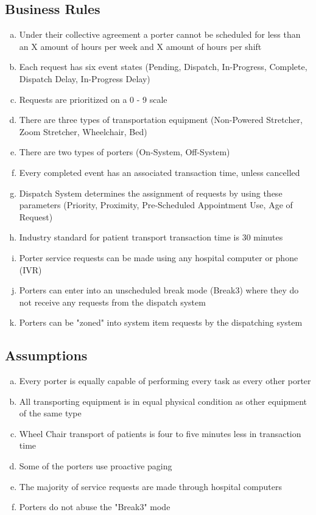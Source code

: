 \documentclass[paper=letter, fontsize=10pt]{scrartcl}
\numberwithin{equation}{section}		%
\numberwithin{figure}{section}			%
\numberwithin{table}{section}				%
\begin{document}
\subsection{Business Rules}
\begin{enumerate}[(a)]
	\item Under their collective agreement a porter cannot be scheduled for less than an X amount of hours per week and X amount of hours per shift 
	\item Each request has six event states (Pending, Dispatch, In-Progress, Complete, Dispatch Delay, In-Progress Delay)
	\item Requests are prioritized on a 0 - 9 scale
	\item There are three types of transportation equipment (Non-Powered Stretcher, Zoom Stretcher, Wheelchair, Bed)
	\item There are two types of porters (On-System, Off-System)
	\item Every completed event has an associated transaction time, unless cancelled
	\item Dispatch System determines the assignment of requests by using these parameters (Priority, Proximity, Pre-Scheduled Appointment Use, Age of Request) 
	\item Industry standard for patient transport transaction time is 30 minutes
	\item Porter service requests can be made using any hospital computer or phone (IVR)
	\item Porters can enter into an unscheduled break mode (Break3) where they do not receive any requests from the dispatch system
	\item Porters can be "zoned" into system item requests by the dispatching system  
\end{enumerate}	    
\subsection{Assumptions}
\begin{enumerate}[(a)]
	\item Every porter is equally capable of performing every task as every other porter
	\item All transporting equipment is in equal physical condition as other equipment of the same type
	\item Wheel Chair transport of patients is four to five minutes less in transaction time
	\item Some of the porters use proactive paging  
	\item The majority of service requests are made through hospital computers
	\item Porters do not abuse the "Break3" mode
\end{enumerate}
\end{document}
